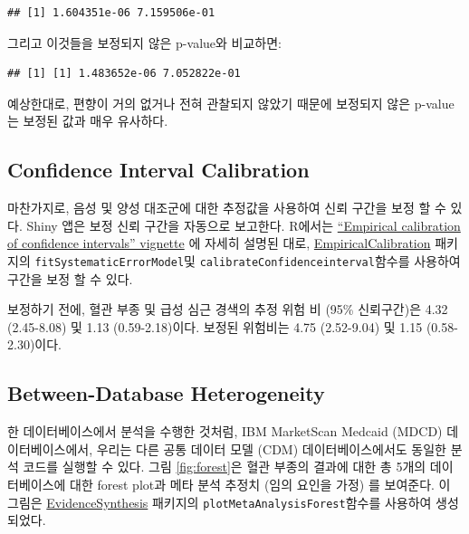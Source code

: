 \documentclass[11pt]{book}
\newenvironment{Shaded}{\begin{snugshade}}{\end{snugshade}}
\newcommand{\OperatorTok}[1]{\textcolor[rgb]{0.81,0.36,0.00}{\textbf{#1}}}
\newcommand{\NormalTok}[1]{#1}
\theoremstyle{definition}
\theoremstyle{definition}
\theoremstyle{definition}
\theoremstyle{remark}
\begin{document}
\begin{verbatim}
## [1] 1.604351e-06 7.159506e-01
\end{verbatim}

그리고 이것들을 보정되지 않은 p-value와 비교하면:

\begin{Shaded}
\end{Shaded}

\begin{verbatim}
## [1] [1] 1.483652e-06 7.052822e-01
\end{verbatim}

예상한대로, 편향이 거의 없거나 전혀 관찰되지 않았기 때문에 보정되지 않은
p-value는 보정된 값과 매우 유사하다.

\subsection{Confidence Interval
Calibration}\label{confidence-interval-calibration-1}

마찬가지로, 음성 및 양성 대조군에 대한 추정값을 사용하여 신뢰 구간을
보정 할 수 있다. Shiny 앱은 보정 신뢰 구간을 자동으로 보고한다. R에서는
\href{https://ohdsi.github.io/EmpiricalCalibration/articles/EmpiricalCiCalibrationVignette.html}{``Empirical
calibration of confidence intervals'' vignette} 에 자세히 설명된 대로,
\href{https://ohdsi.github.io/EmpiricalCalibration/}{EmpiricalCalibration}
패키지의 \texttt{fitSystematicErrorModel}및
\texttt{calibrateConfidenceinterval}함수를 사용하여 구간을 보정 할 수
있다.

보정하기 전에, 혈관 부종 및 급성 심근 경색의 추정 위험 비 (95\%
신뢰구간)은 4.32 (2.45-8.08) 및 1.13 (0.59-2.18)이다. 보정된 위험비는
4.75 (2.52-9.04) 및 1.15 (0.58-2.30)이다.

\subsection{Between-Database
Heterogeneity}\label{between-database-heterogeneity}

한 데이터베이스에서 분석을 수행한 것처럼, IBM MarketScan Medcaid (MDCD)
데이터베이스에서, 우리는 다른 공통 데이터 모델 (CDM) 데이터베이스에서도
동일한 분석 코드를 실행할 수 있다. 그림 \ref{fig:forest}은 혈관 부종의
결과에 대한 총 5개의 데이터베이스에 대한 forest plot과 메타 분석 추정치
(임의 요인을 가정) \citep{dersimonian_1986} 를 보여준다. 이 그림은
\href{https://ohdsi.github.io/EvidenceSynthesis/}{EvidenceSynthesis}
패키지의 \texttt{plotMetaAnalysisForest}함수를 사용하여 생성되었다.
\end{document}
